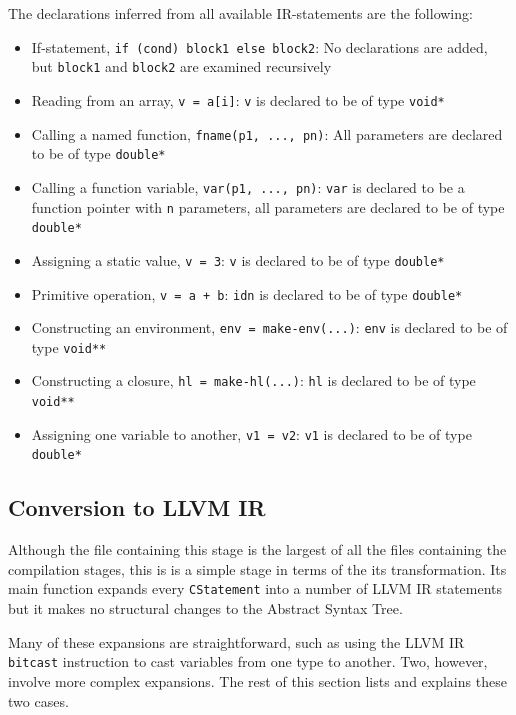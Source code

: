 \documentclass[11pt]{report}
\begin{document}
The declarations inferred from all available IR-statements are the following:
\begin{itemize}
\item If-statement, \texttt{if (cond) block1 else block2}: No declarations are added, but \texttt{block1} and \texttt{block2} are examined recursively
\item Reading from an array, \texttt{v = a[i]}: \texttt{v} is declared to be of type \texttt{void*}
\item Calling a named function, \texttt{fname(p1, ..., pn)}: All parameters are declared to be of type \texttt{double*}
\item Calling a function variable, \texttt{var(p1, ..., pn)}: \texttt{var} is declared to be a function pointer with \texttt{n} parameters, all parameters are declared to be of type \texttt{double*}
\item Assigning a static value, \texttt{v = 3}: \texttt{v} is declared to be of type \texttt{double*}
\item Primitive operation, \texttt{v = a + b}: \texttt{idn} is declared to be of type \texttt{double*}
\item Constructing an environment, \texttt{env = make-env(...)}: \texttt{env} is declared to be of type \texttt{void**}
\item Constructing a closure, \texttt{hl = make-hl(...)}: \texttt{hl} is declared to be of type \texttt{void**}
\item Assigning one variable to another, \texttt{v1 = v2}: \texttt{v1} is declared to be of type \texttt{double*}
\end{itemize}

\subsection{Conversion to LLVM IR}

Although the file containing this stage is the largest of all the files containing the compilation stages, this is is a simple stage in terms of the its transformation. Its main function expands every \texttt{CStatement} into a number of LLVM IR statements but it makes no structural changes to the Abstract Syntax Tree.

Many of these expansions are straightforward, such as using the LLVM IR \texttt{bitcast} instruction to cast variables from one type to another. Two, however, involve more complex expansions. The rest of this section lists and explains these two cases.
\end{document}
